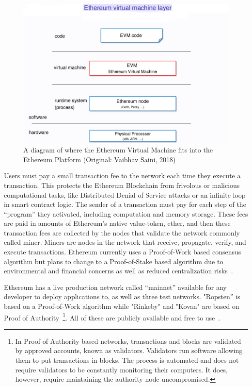 \begin{figure}[h]
  \centering
  \includegraphics[width=1\linewidth]{imgs/ethereumVirtualMachine.png}
  \caption{\label{fig:evm} A diagram of where the Ethereum Virtual Machine fits
  into the Ethereum Platform (Original: Vaibhav Saini, 2018)}
\end{figure}

Users must pay a small transaction fee to the network each time they execute a
transaction. This protects the Ethereum Blockchain from frivolous or malicious
computational tasks, like Distributed Denial of Service attacks or an infinite
loop in smart contract logic. The sender of a transaction must pay for each
step of the “program” they activated, including computation and memory storage.
These fees are paid in amounts of Ethereum’s native value-token, ether, and
then these transaction fees are collected by the nodes that validate the
network commonly called miner. Miners are nodes in the network that receive,
propagate, verify, and execute transactions. Ethereum currently uses a
Proof-of-Work based consensus algorithm but plans to change to a Proof-of-Stake
based algorithm due to environmental and financial concerns as well as reduced
centralization risks~\cite{EthereumDocs2018,EthereumPOSFAQ2018}.

Ethereum has a live production network called “mainnet” available for any
developer to deploy applications to, as well as three test networks. "Ropsten”
is based on a Proof-of-Work algorithm while "Rinkeby" and "Kovan" are based on
Proof of Authority~\footnote{In Proof of Authority based networks, transactions
and blocks are validated by approved accounts, known as validators. Validators
run software allowing them to put transactions in blocks. The process is
automated and does not require validators to be constantly monitoring their
computers. It does, however, require maintaining the authority node
uncompromised.}. All of these are publicly available and free to
use~\cite{Barclay2017,EthereumTestNetworks2018}.

